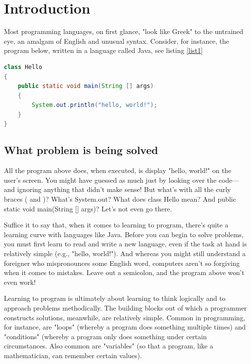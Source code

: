 \section*{Introduction}

Most programming languages, on first glance, "look like Greek" to the untrained eye, an amalgam of English and unusual syntax. Consider, for instance, the program below, written in a language called Java, see listing 
\ref{list1}

\begin{lstlisting}[language=Java, caption={Java example, code is listed}, label=list1]
class Hello
{
    public static void main(String [] args)
    {
        System.out.println("hello, world!");
    }
}
\end{lstlisting}


\subsection{What problem is being solved}

All the program above does, when executed, is display "hello, world!" on the user's screen. You might have guessed as much just by looking over the code—and ignoring anything that didn't make sense! But what's with all the curly braces ({ and })? What's System.out? What does class Hello mean? And public static void main(String [] args)? Let's not even go there. 

Suffice it to say that, when it comes to learning to program, there's quite a learning curve with languages like Java. Before you can begin to solve problems, you must first learn to read and write a new language, even if the task at hand is relatively simple (e.g., "hello, world!"). And whereas you might still understand a foreigner who mispronounces some English word, computers aren't so forgiving when it comes to mistakes. Leave out a semicolon, and the program above won't even work! 

Learning to program is ultimately about learning to think logically and to approach problems methodically. The building blocks out of which a programmer constructs solutions, meanwhile, are relatively simple. Common in programming, for instance, are "loops" (whereby a program does something multiple times) and "conditions" (whereby a program only does something under certain circumstances. Also common are "variables" (so that a program, like a mathematician, can remember certain values). 

